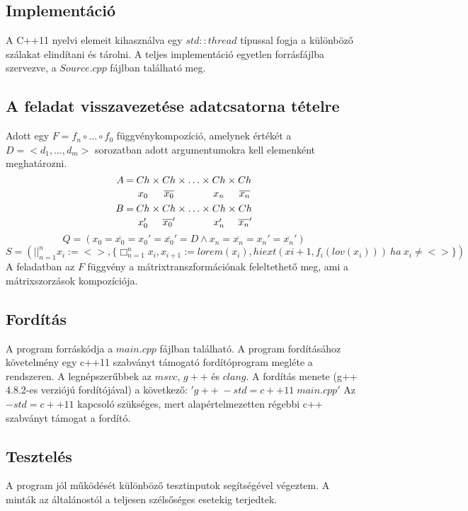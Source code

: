 \documentclass{article}
\begin{document}
\subsection{Implementáció}
A C++11 nyelvi elemeit kihasználva egy $std::thread$ típussal fogja a különböző szálakat elindítani és tárolni.
A teljes implementáció egyetlen forrásfájlba szervezve, a $Source.cpp$ fájlban található meg.

\subsection{A feladat visszavezetése adatcsatorna tételre}
Adott egy $F = f_n \circ \ldots  \circ f_0$ függvénykompozíció, amelynek értékét a $D= <d_1,\ldots,d_m>$ sorozatban adott argumentumokra kell elemenként meghatározni.
\begin{displaymath}
{ A \atop } { = \atop } {Ch \atop x_0}
{ \times \atop } {Ch \atop \overline{x_0}} { \times \atop } { \ldots \atop }  { \times \atop } {Ch \atop x_n} { \times \atop } {Ch \atop \overline{x_n}}  
\end{displaymath}
\begin{displaymath}
{ B \atop } { = \atop } {Ch \atop x_0'}
{ \times \atop } {Ch \atop \overline{x_0}'} { \times \atop } { \ldots \atop }  { \times \atop } {Ch \atop x_n'} { \times \atop } {Ch \atop \overline{x_n}'}  
\end{displaymath}
\begin{displaymath}
Q =  ( x_0 = \overline{x_0} = x_0' = \overline{x_0}' = D \wedge x_n = \overline{x_n} = x_n' = \overline{x_n}' )
\end{displaymath}
\begin{displaymath}
S =  ( ||_{n=1}^{n} x_i := <>, \{\Box_{n=1}^{n} x_i, x_{i+1} := lorem(x_i), hiext(x{i+1, f_i(lov(x_i))}) \ ha \ x_i \neq <>\} )
\end{displaymath}
A feladatban az $F$ függvény a mátrixtranszformációnak feleltethető meg, ami a mátrixszorzások kompozíciója.

\subsection{Fordítás}
A program forráskódja a $main.cpp$ fájlban található.
A program fordításához követelmény egy c++11 szabványt támogató fordítóprogram megléte a rendszeren. A legnépszerűbbek az $msvc$, $g++$ és $clang$.
A fordítás menete (g++ 4.8.2-es verziójú fordítójával) a következő: $'g++ \; -std=c++11 \; main.cpp'$
Az $-std=c++11$ kapcsoló szükséges, mert alapértelmezetten régebbi c++ szabványt támogat a fordító.

\subsection{Tesztelés}
A program jól működését különböző tesztinputok segítségével végeztem. A minták az általánostól a teljesen szélsőséges esetekig terjedtek.
\end{document}
